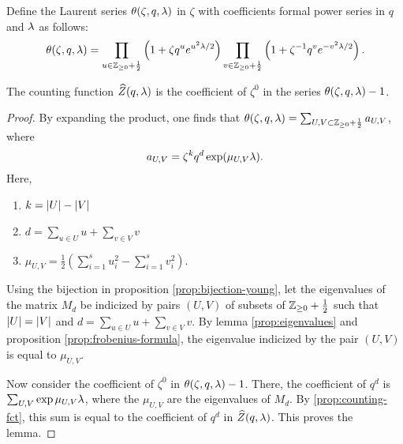 \begin{defi}
 Define the Laurent series $\theta(\zeta,q,\lambda)$ in $\zeta$ with coefficients formal power series in $q$ and $\lambda$ as follows:
 \[
  \theta(\zeta,q,\lambda) = \prod_{u\in\mathbb{Z}_{\geq 0}+\frac{1}{2}} \left(1+\zeta q^u e^{u^2\lambda/2}\right) \prod_{v\in\mathbb{Z}_{\geq 0}+\frac{1}{2}} \left(1+\zeta^{-1} q^v e^{-v^2\lambda/2}\right).
 \]
\end{defi}

\begin{lemma} \label{prop:theta-expansion}
 The counting function $\widehat{Z}(q,\lambda)$ is the coefficient of $\zeta^0$ in the series $\theta(\zeta,q,\lambda)-1$.
\end{lemma}
\begin{proof}
 By expanding the product, one finds that $\theta(\zeta,q,\lambda)=\sum_{U,V\subset\mathbb{Z}_{\geq 0}+\frac{1}{2}}a_{U,V}$, where \[a_{U,V}=\zeta^k q^d \exp(\mu_{U,V}\lambda).\] Here, \begin{enumerate} \item $k=|U|-|V|$
 \item $d=\sum_{u\in U}u + \sum_{v\in V}v$
 \item $\mu_{U,V}=\frac{1}{2}\left(\sum_{i=1}^s u_i^2 - \sum_{i=1}^s v_i^2\right)$.
 \end{enumerate}
Using the bijection in proposition \ref{prop:bijection-young}, let the eigenvalues of the matrix $M_d$ be indicized by pairs $(U,V)$ of subsets of $\mathbb{Z}_{\geq 0}+\frac{1}{2}$ such that $|U|=|V|$ and $d=\sum_{u\in U}u + \sum_{v\in V}v$. By lemma \ref{prop:eigenvalues} and proposition \ref{prop:frobenius-formula}, the eigenvalue indicized by the pair $(U,V)$ is equal to $\mu_{U,V}$.

Now consider the coefficient of $\zeta^0$ in $\theta(\zeta,q,\lambda)-1$. There, the coefficient of $q^d$ is $\sum_{U,V}\exp{\mu_{U,V}\lambda}$, where the $\mu_{U,V}$ are the eigenvalues of $M_d$. By \ref{prop:counting-fct}, this sum is equal to the coefficient of $q^d$ in $\widehat{Z}(q,\lambda)$. This proves the lemma.
\end{proof}


